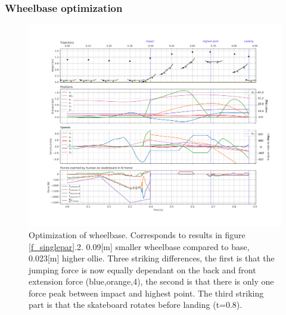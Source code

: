 \subsubsection{Wheelbase optimization}
\begin{figure}
    \centering
    \includegraphics[trim={0cm 0cm 0cm 0cm},clip,width=\textwidth]{figure/Results/data_l_wbdpi600.png}    \vspace{-1cm}\caption[Trajectory, positions, speeds, and forces for wheelbase optimization]{Optimization of wheelbase. Corresponds to results in figure \ref{f_singlepar}.2. 0.09[m] smaller wheelbase compared to base, 0.023[m] higher ollie. Three striking differences, the first is that the jumping force is now equally dependant on the back and front extension force (blue,orange,4), the second is that there is only one force peak between impact and highest point. The third striking part is that the skateboard rotates before landing (t=0.8).}
    \label{f_wheelbase}
\end{figure}
